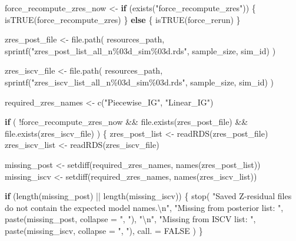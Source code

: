 \documentclass[
  english,
  letterpaper,
  DIV=11,
  numbers=noendperiod]{scrartcl}
\newenvironment{Shaded}{\begin{snugshade}}{\end{snugshade}}
\newcommand{\AttributeTok}[1]{\textcolor[rgb]{0.40,0.45,0.13}{#1}}
\newcommand{\ConstantTok}[1]{\textcolor[rgb]{0.56,0.35,0.01}{#1}}
\newcommand{\ControlFlowTok}[1]{\textcolor[rgb]{0.00,0.23,0.31}{\textbf{#1}}}
\newcommand{\FunctionTok}[1]{\textcolor[rgb]{0.28,0.35,0.67}{#1}}
\newcommand{\NormalTok}[1]{\textcolor[rgb]{0.00,0.23,0.31}{#1}}
\newcommand{\OtherTok}[1]{\textcolor[rgb]{0.00,0.23,0.31}{#1}}
\newcommand{\SpecialCharTok}[1]{\textcolor[rgb]{0.37,0.37,0.37}{#1}}
\newcommand{\StringTok}[1]{\textcolor[rgb]{0.13,0.47,0.30}{#1}}
\begin{document}
\begin{Shaded}
\begin{Highlighting}[]
\NormalTok{force\_recompute\_zres\_now }\OtherTok{\textless{}{-}} \ControlFlowTok{if}\NormalTok{ (}\FunctionTok{exists}\NormalTok{(}\StringTok{"force\_recompute\_zres"}\NormalTok{)) \{}
  \FunctionTok{isTRUE}\NormalTok{(force\_recompute\_zres)}
\NormalTok{\} }\ControlFlowTok{else}\NormalTok{ \{}
  \FunctionTok{isTRUE}\NormalTok{(force\_rerun)}
\NormalTok{\}}

\NormalTok{zres\_post\_file }\OtherTok{\textless{}{-}} \FunctionTok{file.path}\NormalTok{(}
\NormalTok{  resources\_path,}
  \FunctionTok{sprintf}\NormalTok{(}\StringTok{"zres\_post\_list\_all\_n\%03d\_sim\%03d.rds"}\NormalTok{, sample\_size, sim\_id)}
\NormalTok{)}

\NormalTok{zres\_iscv\_file }\OtherTok{\textless{}{-}} \FunctionTok{file.path}\NormalTok{(}
\NormalTok{  resources\_path,}
  \FunctionTok{sprintf}\NormalTok{(}\StringTok{"zres\_iscv\_list\_all\_n\%03d\_sim\%03d.rds"}\NormalTok{, sample\_size, sim\_id)}
\NormalTok{)}

\NormalTok{required\_zres\_names }\OtherTok{\textless{}{-}} \FunctionTok{c}\NormalTok{(}\StringTok{"Piecewise\_IG"}\NormalTok{, }\StringTok{"Linear\_IG"}\NormalTok{)}

\ControlFlowTok{if}\NormalTok{ (}
  \SpecialCharTok{!}\NormalTok{force\_recompute\_zres\_now }\SpecialCharTok{\&\&}
    \FunctionTok{file.exists}\NormalTok{(zres\_post\_file) }\SpecialCharTok{\&\&}
    \FunctionTok{file.exists}\NormalTok{(zres\_iscv\_file)}
\NormalTok{) \{}
\NormalTok{  zres\_post\_list }\OtherTok{\textless{}{-}} \FunctionTok{readRDS}\NormalTok{(zres\_post\_file)}
\NormalTok{  zres\_iscv\_list }\OtherTok{\textless{}{-}} \FunctionTok{readRDS}\NormalTok{(zres\_iscv\_file)}

\NormalTok{  missing\_post }\OtherTok{\textless{}{-}} \FunctionTok{setdiff}\NormalTok{(required\_zres\_names, }\FunctionTok{names}\NormalTok{(zres\_post\_list))}
\NormalTok{  missing\_iscv }\OtherTok{\textless{}{-}} \FunctionTok{setdiff}\NormalTok{(required\_zres\_names, }\FunctionTok{names}\NormalTok{(zres\_iscv\_list))}

  \ControlFlowTok{if}\NormalTok{ (}\FunctionTok{length}\NormalTok{(missing\_post) }\SpecialCharTok{||} \FunctionTok{length}\NormalTok{(missing\_iscv)) \{}
    \FunctionTok{stop}\NormalTok{(}
      \StringTok{"Saved Z{-}residual files do not contain the expected model names.}\SpecialCharTok{\textbackslash{}n}\StringTok{"}\NormalTok{,}
      \StringTok{"Missing from posterior list: "}\NormalTok{, }\FunctionTok{paste}\NormalTok{(missing\_post, }\AttributeTok{collapse =} \StringTok{", "}\NormalTok{), }\StringTok{"}\SpecialCharTok{\textbackslash{}n}\StringTok{"}\NormalTok{,}
      \StringTok{"Missing from ISCV list: "}\NormalTok{, }\FunctionTok{paste}\NormalTok{(missing\_iscv, }\AttributeTok{collapse =} \StringTok{", "}\NormalTok{),}
      \AttributeTok{call. =} \ConstantTok{FALSE}
\NormalTok{    )}
\NormalTok{  \}}


\end{Highlighting}
\end{Shaded}
\end{document}

